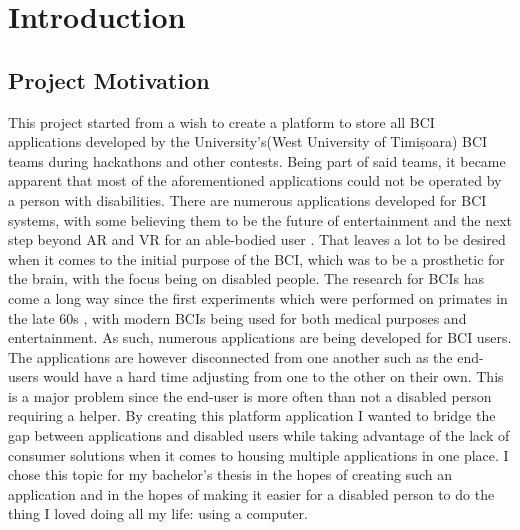 \pagestyle{fancy}
\fancyhf{}%
\fancyhead[RO,LE]{\thepage}%
\fancyhead[RE]{\nouppercase{\leftmark}}%
\renewcommand{\headrulewidth}{0pt}%


\chapter{Introduction}\label{cap:intro}



\section{Project Motivation}\label{sect:motivation}
This project started from a wish to create a platform to store all BCI applications developed by the University's(West University of Timișoara) BCI teams during hackathons and other contests. Being part of said teams, it became apparent that most of the aforementioned applications could not be operated by a person with disabilities.
\vspace{\baselineskip}\newline
There are numerous applications developed for BCI systems, with some believing them to be the future of entertainment and the next step beyond AR and VR for an able-bodied user \cite{future_of_metaverse_BCI}. That leaves a lot to be desired when it comes to the initial purpose of the BCI, which was to be a prosthetic for the brain, with the focus being on disabled people. The research for BCIs has come a long way since the first experiments which were performed on primates in the late 60s \cite{Fetz_1969}, with modern BCIs being used for both medical purposes and entertainment. 
\vspace{\baselineskip}\newline
As such, numerous applications are being developed for BCI users. The applications are however disconnected from one another such as the end-users would have a hard time adjusting from one to the other on their own. This is a major problem since the end-user is more often than not a disabled person requiring a helper. By creating this platform application I wanted to bridge the gap between applications and disabled users while taking advantage of the lack of consumer solutions when it comes to housing multiple applications in one place. I chose this topic for my bachelor's thesis in the hopes of creating such an application and in the hopes of making it easier for a disabled person to do the thing I loved doing all my life: using a computer.



